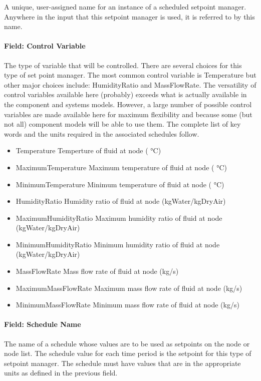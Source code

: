 A unique, user-assigned name for an instance of a scheduled setpoint manager. Anywhere in the input that this setpoint manager is used, it is referred to by this name.

\paragraph{Field: Control Variable}\label{field-control-variable-000}

The type of variable that will be controlled. There are several choices for this type of set point manager. The most common control variable is Temperature but other major choices include: HumidityRatio and MassFlowRate. The versatility of control variables available here (probably) exceeds what is actually available in the component and systems models. However, a large number of possible control variables are made available here for maximum flexibility and because some (but not all) component models will be able to use them. The complete list of key words and the units required in the associated schedules follow.

\begin{itemize}
\item
  Temperature Temperture of fluid at node ( °C)
\item
  MaximumTemperature Maximum temperature of fluid at node ( °C)
\item
  MinimumTemperature Minimum temperature of fluid at node ( °C)
\item
  HumidityRatio Humidity ratio of fluid at node (kgWater/kgDryAir)
\item
  MaximumHumidityRatio Maximum humidity ratio of fluid at node (kgWater/kgDryAir)
\item
  MinimumHumidityRatio Minimum humidity ratio of fluid at node (kgWater/kgDryAir)
\item
  MassFlowRate Mass flow rate of fluid at node (kg/s)
\item
  MaximumMassFlowRate Maximum mass flow rate of fluid at node (kg/s)
\item
  MinimumMassFlowRate Minimum mass flow rate of fluid at node (kg/s)
\end{itemize}

\paragraph{Field: Schedule Name}\label{field-schedule-name-005}

The name of a schedule whose values are to be used as setpoints on the node or node list. The schedule value for each time period is the setpoint for this type of setpoint manager. The schedule must have values that are in the appropriate units as defined in the previous field.

